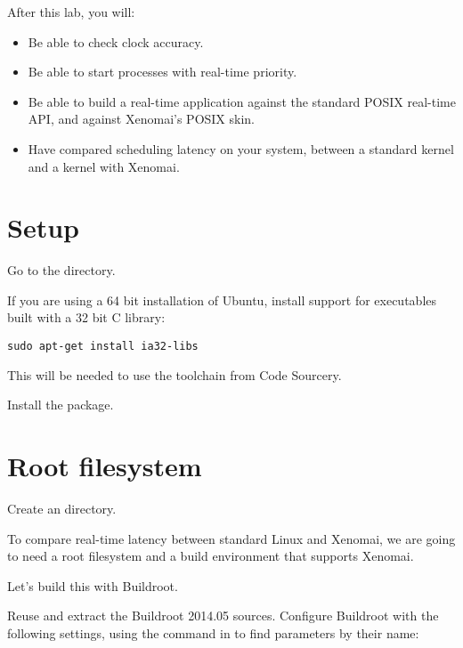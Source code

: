 
After this lab, you will:
\begin{itemize}
\item Be able to check clock accuracy.
\item Be able to start processes with real-time priority.
\item Be able to build a real-time application against the standard
POSIX real-time API, and against Xenomai's POSIX skin.
\item Have compared scheduling latency on your system, between a
  standard kernel and a kernel with Xenomai.
\end{itemize}

\section{Setup}

Go to the  directory.

If you are using a 64 bit installation of Ubuntu, install support for
executables built with a 32 bit C library:

\begin{verbatim}
sudo apt-get install ia32-libs
\end{verbatim}

This will be needed to use the toolchain from Code Sourcery.

Install the  package.

\section{Root filesystem}

Create an  directory.

To compare real-time latency between standard Linux and Xenomai, we
are going to need a root filesystem and a build environment that
supports Xenomai.

Let's build this with Buildroot.

Reuse and extract the Buildroot 2014.05 sources. Configure Buildroot
with the following settings, using the \code{/} command in  to find parameters by their name:

